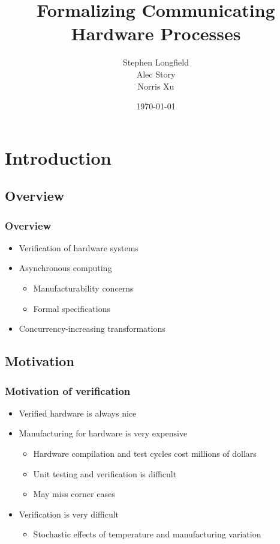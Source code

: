 \documentclass[compress]{beamer}
\title{Formalizing Communicating Hardware Processes}
\author{Stephen Longfield \\
Alec Story \\
Norris Xu
\date{\today}
}
\begin{document}
\begin{frame}[plain]
\titlepage
\end{frame}
\section{Introduction}
\subsection{Overview}
\begin{frame}
\frametitle{Overview}
\begin{itemize}
\item Verification of hardware systems
\item Asynchronous computing
\begin{itemize}
\item Manufacturability concerns
\item Formal specifications
\end{itemize}
\item Concurrency-increasing transformations
\end{itemize}
\end{frame}
\subsection{Motivation}
\begin{frame}
\frametitle{Motivation of verification}
\begin{itemize}
\item Verified hardware is always nice
\item Manufacturing for hardware is very expensive
\begin{itemize}
\item Hardware compilation and test cycles cost millions of dollars
\item Unit testing and verification is difficult
\item May miss corner cases
\end{itemize}
\item Verification is very difficult
\begin{itemize}
\item Stochastic effects of temperature and manufacturing variation
\end{itemize}
\end{itemize}
\end{frame}
\end{document}
